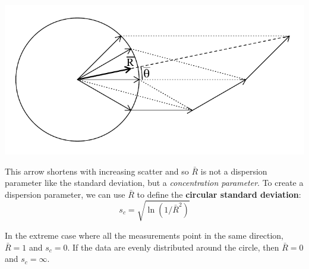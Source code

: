 \noindent\begin{minipage}[t][][b]{.45\textwidth}
\includegraphics[]{../figures/vectorsum.pdf}\medskip
\end{minipage}
\begin{minipage}[t][][t]{.55\textwidth}
  \label{fig:vectorsum}
\end{minipage}

This arrow shortens with increasing scatter and so $\bar{R}$ is not a
dispersion parameter like the standard deviation, but a
\textit{concentration parameter}. To create a dispersion parameter, we
can use $\bar{R}$ to define the \textbf{circular standard deviation}:
\begin{equation}
  s_c = \sqrt{\ln(1/\bar{R}^2)}
  \label{eq:circularSD}
\end{equation}

In the extreme case where all the measurements point in the same
direction, $\bar{R} = 1$ and $s_c = 0$. If the data are evenly
distributed around the circle, then $\bar{R} = 0$ and $s_c = \infty$.

